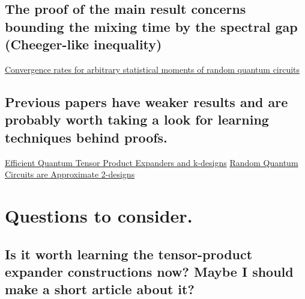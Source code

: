 \documentclass[11pt]{article}
\begin{document}
\subsection{The proof of the main result concerns bounding the mixing time by the spectral gap (Cheeger-like inequality)}
\label{sec:org554aa59}
\href{https://arxiv.org/pdf/0910.0913.pdf}{Convergence rates for arbitrary statistical moments of random quantum circuits
}
\subsection{Previous papers have weaker results and are probably worth taking a look for learning techniques behind proofs.}
\label{sec:org16d9be3}
\href{https://arxiv.org/pdf/0811.2597.pdf}{Efficient Quantum Tensor Product Expanders and k-designs}
\href{https://link.springer.com/content/pdf/10.1007/s00220-009-0873-6.pdf}{Random Quantum Circuits are Approximate 2-designs}

\section{Questions to consider.}
\label{sec:org80761cf}

\subsection{Is it worth learning the tensor-product expander constructions now? Maybe I should make a short article about it?}
\label{sec:orgf9d2e3d}
\end{document}
